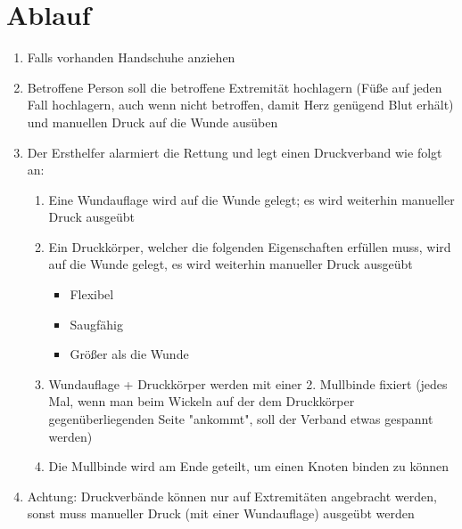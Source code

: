 \section*{Ablauf}
\begin{enumerate}
    \item Falls vorhanden Handschuhe anziehen
    \item Betroffene Person soll die betroffene Extremität hochlagern (Füße auf jeden Fall hochlagern, auch wenn nicht betroffen, damit Herz genügend Blut erhält) und manuellen Druck auf die Wunde ausüben
    \item Der Ersthelfer alarmiert die Rettung und legt einen Druckverband wie folgt an:
    \begin{enumerate}
        \item Eine Wundauflage wird auf die Wunde gelegt; es wird weiterhin manueller Druck ausgeübt
        \item Ein Druckkörper, welcher die folgenden Eigenschaften erfüllen muss, wird auf die Wunde gelegt, es wird weiterhin manueller Druck ausgeübt
        \begin{itemize}
            \item Flexibel
            \item Saugfähig
            \item Größer als die Wunde
        \end{itemize}
        \item Wundauflage + Druckkörper werden mit einer 2. Mullbinde fixiert (jedes Mal, wenn man beim Wickeln auf der dem Druckkörper gegenüberliegenden Seite "ankommt", soll der Verband etwas gespannt werden)
        \item Die Mullbinde wird am Ende geteilt, um einen Knoten binden zu können
    \end{enumerate}
    \item Achtung: Druckverbände können nur auf Extremitäten angebracht werden, sonst muss manueller Druck (mit einer Wundauflage) ausgeübt werden
\end{enumerate}